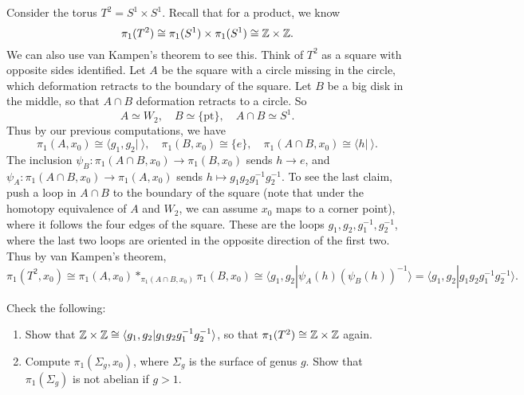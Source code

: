 \begin{example}
  Consider the torus $T^2 = S^1 \times S^1$. Recall
  that for a product, we know
  \[
    \pi_1(T^2) \cong \pi_1(S^1) \times \pi_1(S^1) \cong \mathbb{Z} \times \mathbb{Z}.
  \]
  We can also use van Kampen's theorem to see this.
  Think of $T^2$ as a square with opposite sides
  identified. Let $A$ be the square with a circle
  missing in the circle, which deformation retracts
  to the boundary of the square. Let $B$ be a big disk
  in the middle, so that $A \cap B$ deformation
  retracts to a circle. So
  \[
    A \simeq W_2, \quad B \simeq \{\text{pt}\}, \quad
    A \cap B \simeq S^1.
  \]
  Thus by our previous computations, we have
  \[
    \pi_1(A, x_0) \cong \langle g_1, g_2 | \ \rangle, \quad
    \pi_1(B, x_0) \cong \{e\}, \quad
    \pi_1(A \cap B, x_0) \cong \langle h | \ \rangle.
  \]
  The inclusion $\psi_B : \pi_1(A \cap B, x_0) \to \pi_1(B, x_0)$
  sends $h \to e$, and $\psi_A : \pi_1(A \cap B, x_0) \to \pi_1(A, x_0)$
  sends $h \mapsto g_1 g_2 g_1^{-1} g_2^{-1}$. To see the
  last claim, push a loop in $A \cap B$ to the boundary
  of the square (note that under the homotopy equivalence
  of $A$ and $W_2$, we can assume $x_0$ maps to a corner
  point), where it follows the four edges of the
  square. These are the loops
  $g_1, g_2, g_1^{-1}, g_2^{-1}$, where the last two
  loops are oriented in the opposite direction of
  the first two. Thus by van Kampen's theorem,
  \[
    \pi_1(T^2, x_0) \cong \pi_1(A, x_0) *_{\pi_1(A \cap B, x_0)} \pi_1(B, x_0)
    \cong \langle g_1, g_2 | \psi_A(h)(\psi_B(h))^{-1} \rangle
    = \langle g_1, g_2 | g_1 g_2 g_1^{-1} g_2^{-1} \rangle.
  \]
\end{example}

\begin{exercise}
  Check the following:
  \begin{enumerate}
    \item Show that $\mathbb{Z} \times \mathbb{Z} \cong \langle g_1, g_2 | g_1 g_2 g_1^{-1} g_2^{-1} \rangle$, so that
      $\pi_1(T^2) \cong \mathbb{Z} \times \mathbb{Z}$ again.
    \item Compute $\pi_1(\Sigma_g, x_0)$, where
      $\Sigma_g$ is the surface of genus $g$.
      Show that
      $\pi_1(\Sigma_g)$ is not abelian if $g > 1$.
  \end{enumerate}
\end{exercise}
